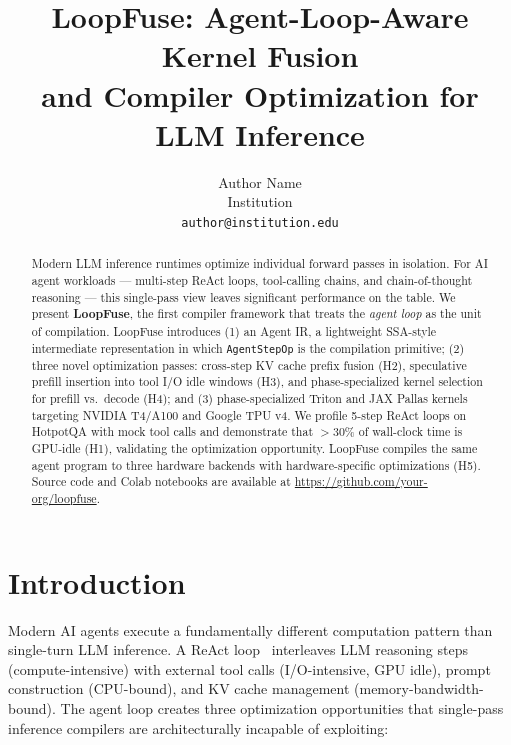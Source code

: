 \documentclass[10pt,twocolumn]{article}
\title{\textbf{LoopFuse}: Agent-Loop-Aware Kernel Fusion\\
       and Compiler Optimization for LLM Inference}
\author{Author Name\\
  Institution\\
  \texttt{author@institution.edu}}
\date{}
\begin{document}
\maketitle

\begin{abstract}
Modern LLM inference runtimes optimize individual forward passes in isolation.
For AI agent workloads — multi-step ReAct loops, tool-calling chains, and
chain-of-thought reasoning — this single-pass view leaves significant performance
on the table. We present \textbf{LoopFuse}, the first compiler framework that
treats the \emph{agent loop} as the unit of compilation. LoopFuse introduces
(1) an Agent IR, a lightweight SSA-style intermediate representation in which
\texttt{AgentStepOp} is the compilation primitive; (2) three novel optimization
passes: cross-step KV cache prefix fusion (H2), speculative prefill insertion
into tool I/O idle windows (H3), and phase-specialized kernel selection for
prefill vs.\ decode (H4); and (3) phase-specialized Triton and JAX Pallas
kernels targeting NVIDIA T4/A100 and Google TPU v4.
We profile 5-step ReAct loops on HotpotQA with mock tool calls and demonstrate
that $> 30\%$ of wall-clock time is GPU-idle (H1), validating the optimization
opportunity. LoopFuse compiles the same agent program to three hardware backends
with hardware-specific optimizations (H5). Source code and Colab notebooks
are available at \url{https://github.com/your-org/loopfuse}.
\end{abstract}

\section{Introduction}

Modern AI agents execute a fundamentally different computation pattern than
single-turn LLM inference. A ReAct loop~\cite{yao2023react} interleaves
LLM reasoning steps (compute-intensive) with external tool calls (I/O-intensive,
GPU idle), prompt construction (CPU-bound), and KV cache management
(memory-bandwidth-bound). The agent loop creates three optimization opportunities
that single-pass inference compilers are architecturally incapable of exploiting:
\end{document}

